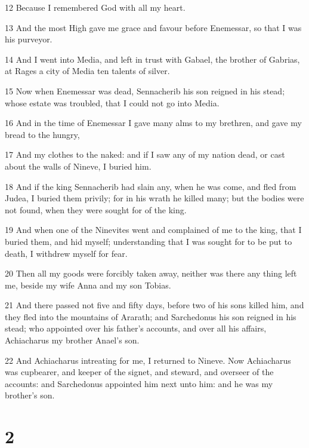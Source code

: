 \par 12 Because I remembered God with all my heart.
\par 13 And the most High gave me grace and favour before Enemessar, so that I was his purveyor.
\par 14 And I went into Media, and left in trust with Gabael, the brother of Gabrias, at Rages a city of Media ten talents of silver.
\par 15 Now when Enemessar was dead, Sennacherib his son reigned in his stead; whose estate was troubled, that I could not go into Media.
\par 16 And in the time of Enemessar I gave many alms to my brethren, and gave my bread to the hungry,
\par 17 And my clothes to the naked: and if I saw any of my nation dead, or cast about the walls of Nineve, I buried him.
\par 18 And if the king Sennacherib had slain any, when he was come, and fled from Judea, I buried them privily; for in his wrath he killed many; but the bodies were not found, when they were sought for of the king.
\par 19 And when one of the Ninevites went and complained of me to the king, that I buried them, and hid myself; understanding that I was sought for to be put to death, I withdrew myself for fear.
\par 20 Then all my goods were forcibly taken away, neither was there any thing left me, beside my wife Anna and my son Tobias.
\par 21 And there passed not five and fifty days, before two of his sons killed him, and they fled into the mountains of Ararath; and Sarchedonus his son reigned in his stead; who appointed over his father's accounts, and over all his affairs, Achiacharus my brother Anael's son.
\par 22 And Achiacharus intreating for me, I returned to Nineve. Now Achiacharus was cupbearer, and keeper of the signet, and steward, and overseer of the accounts: and Sarchedonus appointed him next unto him: and he was my brother's son.

\chapter{2}

